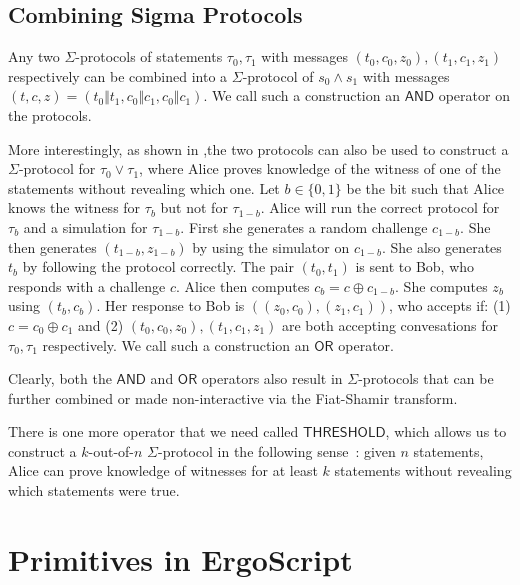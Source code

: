 \documentclass[11pt]{article}
\newcommand{\authnote}[2]{\marginpar{\parbox{\marginparwidth}{\tiny %
  \textsf{#1 {\textcolor{blue}{notes: #2}}}}}%
  \textcolor{blue}{\textbf{\dag}}}
\newcommand{\authnote}[2]{
  \textsf{#1 \textcolor{blue}{: #2}}}
\newcommand{\authnote}[2]{}
\newcommand{\snote}[1]{{\authnote{\textcolor{yellow}{Scalahub notes}}{#1}}}
\newcommand{\andnode}{\ensuremath{\mathsf{AND}}}
\newcommand{\ornode}{\ensuremath{\mathsf{OR}}}
\newcommand{\tnode}{\ensuremath{\mathsf{THRESHOLD}}}
\begin{document}
\subsection{Combining Sigma Protocols}

Any two $\Sigma$-protocols of statements $\tau_0, \tau_1$ with messages $(t_0, c_0, z_0), (t_1, c_1, z_1)$ respectively can be combined into a $\Sigma$-protocol of $s_0 \land s_1$ with messages $(t, c, z) = (t_0\Vert t_1,c_0\Vert c_1, c_0\Vert c_1)$. We call such a construction an $\andnode$ operator on the protocols. %

More interestingly, as shown in \cite{orprotocol},the two protocols can also be used to construct a $\Sigma$-protocol for $\tau_0\lor \tau_1$, where Alice proves knowledge of the witness of one of the statements without revealing which one. Let $b\in \{0, 1\}$ be the bit such that Alice knows the witness for $\tau_b$ but not for $\tau_{1-b}$. Alice will run the correct protocol for $\tau_b$ and a simulation for $\tau_{1-b}$. First she generates a random challenge $c_{1-b}$. She then generates $(t_{1-b}, z_{1-b})$ by using the simulator on $c_{1-b}$. She also generates $t_b$ by following the protocol correctly. The pair $(t_0, t_1)$ is sent to Bob, who responds with a challenge $c$. Alice then computes $c_b = c\oplus c_{1-b}$. She computes $z_b$ using $(t_b, c_b)$. Her response to Bob is $((z_0, c_0), (z_1, c_1))$, who accepts if: (1) $c = c_0 \oplus c_1$ and (2) $(t_0, c_0, z_0), (t_1, c_1, z_1)$ are both accepting convesations for $\tau_0, \tau_1$ respectively. We call such a construction an $\ornode$ operator. 

Clearly, both the $\andnode$ and $\ornode$ operators also result in $\Sigma$-protocols that can be further combined or made non-interactive via the Fiat-Shamir transform. 

There is one more operator that we need called $\tnode$, which allows us to construct a $k$-out-of-$n$ $\Sigma$-protocol in the following sense~\cite{threshold}: given $n$ statements, Alice can prove knowledge of witnesses for at least $k$ statements without revealing which statements were true. 

\snote{Describe Threshold briefly}
\section{Primitives in ErgoScript}
\end{document}
